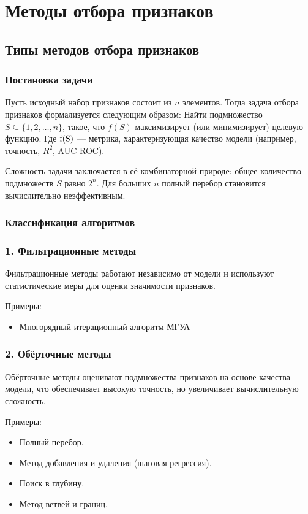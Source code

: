 \chapter{Методы отбора признаков}

\section*{Типы методов отбора признаков}

\subsection*{Постановка задачи}
Пусть исходный набор признаков состоит из \( n \) элементов. Тогда задача отбора признаков формализуется следующим образом: 
Найти подмножество $S \subseteq \{1, 2, \dots, n\}$, такое, что $f(S)$ максимизирует (или минимизирует) целевую функцию. Где \( $f(S)$ \) — метрика, характеризующая качество модели (например, точность, $ R^2 $, AUC-ROC).

Сложность задачи заключается в её комбинаторной природе: общее количество подмножеств \( S \) равно \( 2^n \). Для больших \( n \) полный перебор становится вычислительно неэффективным.

\subsection*{Классификация алгоритмов}

\subsection*{1. Фильтрационные методы}
Фильтрационные методы работают независимо от модели и используют статистические меры для оценки значимости признаков.

Примеры:
\begin{itemize}
    \item Многорядный итерационный алгоритм МГУА 
\end{itemize}

\subsection*{2. Обёрточные методы}
Обёрточные методы оценивают подмножества признаков на основе качества модели, что обеспечивает высокую точность, но увеличивает вычислительную сложность.  

Примеры:
\begin{itemize}
    \item Полный перебор.
    \item Метод добавления и удаления (шаговая регрессия).
    \item Поиск в глубину.
    \item Метод ветвей и границ.
\end{itemize}

